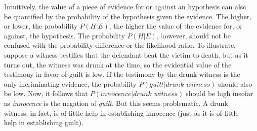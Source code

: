 \documentclass[10pt]{article}
\begin{document}

Intuitively, the value of a piece of evidence for or against an hypothesis can also be quantified by the probability 
of the hypothesis given the evidence. The higher, or lower, the probability $P(H|E)$, the higher 
the value of the evidence for, or against, the hypothesis. The probability $P(H|E)$, however, should not be confused with the probability difference or the likelihood ratio. To illustrate, suppose a witness testifies that the defendant beat the victim to death, but as it turns out, the witness 
was drunk at the time, so the evidential value of the testimony in favor of guilt is low. 
If the testimony by the drunk witness is the only incriminating evidence, the probability 
$P(\textit{guilt} | \textit{drunk witness})$ should also be low. Now, it follows that $P(\textit{innocence} | \textit{drunk witness})$ 
should be high insofar as \textit{innocence} is the negation of \textit{guilt}. 
But this seems problematic. A drunk witness, in fact, is of little help in establishing 
innocence (just as it is of little help in establishing guilt).
\end{document}
